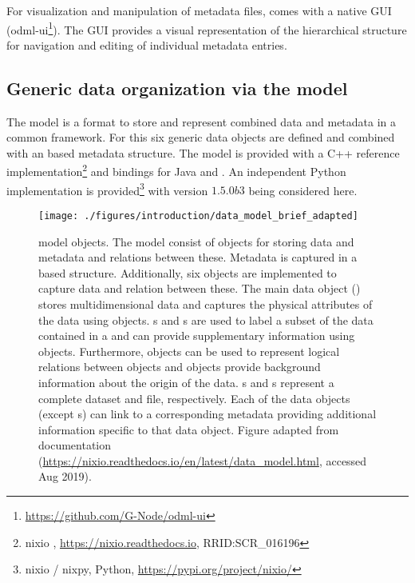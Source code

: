 For visualization and manipulation of metadata files,  comes with a native  GUI (odml-ui\footnote{\url{https://github.com/G-Node/odml-ui}}). The GUI provides a visual representation of the hierarchical structure for navigation and editing of individual metadata entries.


\subsection{Generic data organization via the  model}
The  model is a format to store and represent combined data and metadata in a common framework. For this six generic data objects are defined and combined with an  based metadata structure. The  model is provided with a C++ reference implementation\footnote{nixio , \url{https://nixio.readthedocs.io},  RRID:SCR\_016196} and bindings for Java and . An independent Python implementation is provided\footnote{nixio / nixpy, Python, \url{https://pypi.org/project/nixio/}} with version $1.5.0b3$ being considered here.

\begin{figure}[hbtp]
 \texttt{[image: ./figures/introduction/data\_model\_brief\_adapted]}
 \caption[ model objects]{ model objects. The model consist of objects for storing data and metadata and relations between these. Metadata is captured in a  based structure. Additionally, six objects are implemented to capture data and relation between these. The main data object () stores multidimensional data and captures the physical attributes of the data using  objects. s and s are used to label a subset of the data contained in a  and can provide supplementary information using  objects. Furthermore,  objects can be used to represent logical relations between objects and  objects provide background information about the origin of the data. s and s represent a complete dataset and file, respectively. Each of the data objects (except s) can link to a corresponding metadata  providing additional information specific to that data object. Figure adapted from  documentation (\url{https://nixio.readthedocs.io/en/latest/data_model.html}, accessed Aug 2019).}
 \label{fig:intro_nix_model}
\end{figure}

